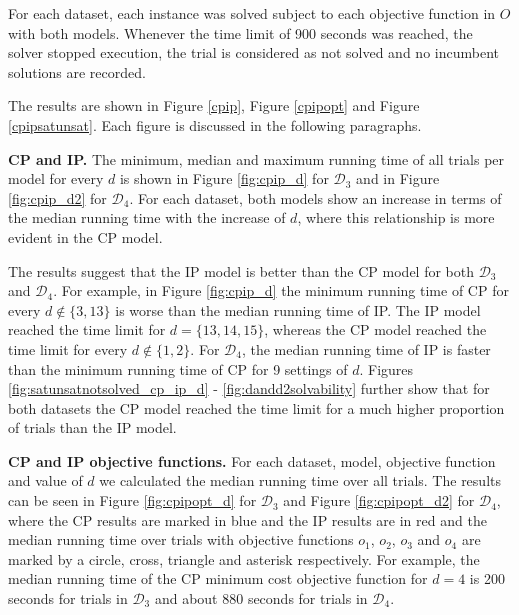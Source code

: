 \documentclass{mpaper}
\begin{document}
For each dataset, each instance was solved subject to each objective function in $O$ with both models. Whenever the time limit of 900 seconds was reached, the solver stopped execution, the trial is considered as not solved and no incumbent solutions are recorded.

The results are shown in Figure \ref{cpip}, Figure \ref{cpipopt} and Figure \ref{cpipsatunsat}. Each figure is discussed in the following paragraphs.

\textbf{CP and IP.} The minimum, median and maximum running time of all trials per model for every $d$ is shown in Figure \ref{fig:cpip_d} for $\mathcal{D}_3$ and in Figure \ref{fig:cpip_d2} for $\mathcal{D}_4$. For each dataset, both models show an increase in terms of the median running time with the increase of $d$, where this relationship is more evident in the CP model.

The results suggest that the IP model is better than the CP model for both $\mathcal{D}_3$ and $\mathcal{D}_4$. For example, in Figure \ref{fig:cpip_d} the minimum running time of CP for every $d \notin \{3, 13\}$ is worse than the median running time of IP. The IP model reached the time limit for $d=\{13,14,15\}$, whereas the CP model reached the time limit for every $d \notin \{1,2\}$. For $\mathcal{D}_4$, the median running time of IP is faster than the minimum running time of CP for 9 settings of $d$. Figures \ref{fig:satunsatnotsolved_cp_ip_d} - \ref{fig:dandd2solvability} further show that for both datasets the CP model reached the time limit for a much higher proportion of trials than the IP model.


\textbf{CP and IP objective functions.} For each dataset, model, objective function and value of $d$ we calculated the median running time over all trials. The results can be seen in Figure \ref{fig:cpipopt_d} for $\mathcal{D}_3$ and Figure \ref{fig:cpipopt_d2} for $\mathcal{D}_4$, where the CP results are marked in blue and the IP results are in red and the median running time over trials with objective functions $o_1$, $o_2$, $o_3$ and $o_4$ are marked by a circle, cross, triangle and asterisk respectively. For example, the median running time of the CP minimum cost objective function for $d = 4$ is 200 seconds for trials in $\mathcal{D}_3$ and about 880 seconds for trials in $\mathcal{D}_4$.
\end{document}
